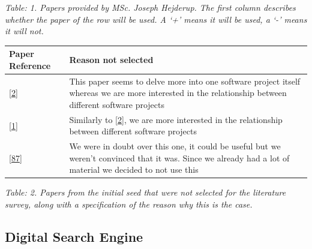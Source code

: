 \documentclass[]{book}
\begin{document}
\emph{Table: 1. Papers provided by MSc. Joseph Hejderup. The first
column describes whether the paper of the row will be used. A `+' means
it will be used, a `-' means it will not.}

\begin{longtable}[]{@{}ll@{}}
\toprule
\begin{minipage}[b]{0.05\columnwidth}\raggedright\strut
Paper Reference\strut
\end{minipage} & \begin{minipage}[b]{0.05\columnwidth}\raggedright\strut
Reason not selected\strut
\end{minipage}\tabularnewline
\midrule
\endhead
\begin{minipage}[t]{0.05\columnwidth}\raggedright\strut
{[}\protect\hyperlink{ref-Abate2009}{2}{]}\strut
\end{minipage} & \begin{minipage}[t]{0.05\columnwidth}\raggedright\strut
This paper seems to delve more into one software project itself whereas
we are more interested in the relationship between different software
projects\strut
\end{minipage}\tabularnewline
\begin{minipage}[t]{0.05\columnwidth}\raggedright\strut
{[}\protect\hyperlink{ref-Abate2011}{1}{]}\strut
\end{minipage} & \begin{minipage}[t]{0.05\columnwidth}\raggedright\strut
Similarly to {[}\protect\hyperlink{ref-Abate2009}{2}{]}, we are more
interested in the relationship between different software projects\strut
\end{minipage}\tabularnewline
\begin{minipage}[t]{0.05\columnwidth}\raggedright\strut
{[}\protect\hyperlink{ref-Mens2013}{87}{]}\strut
\end{minipage} & \begin{minipage}[t]{0.05\columnwidth}\raggedright\strut
We were in doubt over this one, it could be useful but we weren't
convinced that it was. Since we already had a lot of material we decided
to not use this\strut
\end{minipage}\tabularnewline
\bottomrule
\end{longtable}

\emph{Table: 2. Papers from the initial seed that were not selected for
the literature survey, along with a specification of the reason why this
is the case.}

\subsection{Digital Search Engine}\label{digital-search-engine}
\end{document}
